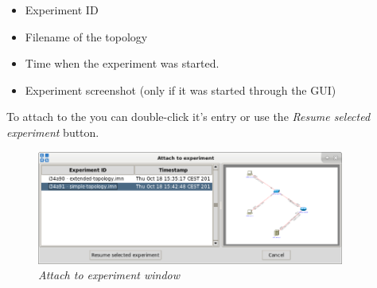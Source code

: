 \begin{itemize}
\item Experiment ID
\item Filename of the topology
\item Time when the experiment was started.
\item Experiment screenshot (only if it was started through the GUI)
\end{itemize}

To attach to the you can double-click it's entry or use the \emph{Resume selected
experiment} button.
\begin{figure}[H]
  \centering
  \vspace{10pt}
  \includegraphics[width=0.90\textwidth]{./images/attach_to_experiment.png}
  \caption{\emph{Attach to experiment window}}
  \label{fig:attach_to_experiment}
\end{figure}
